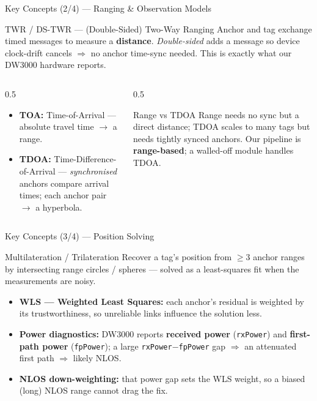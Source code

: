 \documentclass[aspectratio=169,10pt]{beamer}
\begin{document}
\begin{frame}{Key Concepts (2/4) --- Ranging \& Observation Models}
  \begin{block}{TWR / DS-TWR --- (Double-Sided) Two-Way Ranging}
    Anchor and tag exchange timed messages to measure a \textbf{distance}. \emph{Double-sided}
    adds a message so device clock-drift cancels $\Rightarrow$ \alert{no anchor time-sync needed}.
    This is exactly what our DW3000 hardware reports.
  \end{block}
  \begin{columns}[T]
    \begin{column}{0.5\textwidth}
      \begin{itemize}\small
        \item \textbf{TOA:} Time-of-Arrival --- absolute travel time $\to$ a range.
        \item \textbf{TDOA:} Time-Difference-of-Arrival --- \emph{synchronised} anchors compare
              arrival times; each anchor pair $\to$ a hyperbola.
      \end{itemize}
    \end{column}
    \begin{column}{0.5\textwidth}
      \begin{block}{Range vs TDOA}
        \footnotesize Range needs no sync but a direct distance; TDOA scales to many tags but needs
        tightly synced anchors. Our pipeline is \textbf{range-based}; a walled-off module handles TDOA.
      \end{block}
    \end{column}
  \end{columns}
\end{frame}

\begin{frame}{Key Concepts (3/4) --- Position Solving}
  \begin{block}{Multilateration / Trilateration}
    Recover a tag's position from $\geq 3$ anchor ranges by intersecting range circles / spheres ---
    solved as a least-squares fit when the measurements are noisy.
  \end{block}
  \begin{itemize}\small
    \item \textbf{WLS --- Weighted Least Squares:} each anchor's residual is weighted by its
          trustworthiness, so unreliable links influence the solution less.
    \item \textbf{Power diagnostics:} DW3000 reports \textbf{received power} (\texttt{rxPower}) and
          \textbf{first-path power} (\texttt{fpPower}); a large \texttt{rxPower$-$fpPower} gap $\Rightarrow$
          an attenuated first path $\Rightarrow$ likely \alert{NLOS}.
    \item \textbf{NLOS down-weighting:} that power gap sets the WLS weight, so a biased (long) NLOS
          range cannot drag the fix.
  \end{itemize}
\end{frame}
\end{document}
